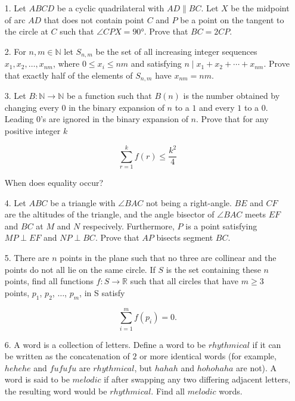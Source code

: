 \documentclass{article}
\begin{document}
\begin{enumerate}

\bigskip
\item[1.] %
Let $ABCD$ be a cyclic quadrilateral with $AD \parallel BC$. Let $X$ be the midpoint of arc $AD$ that does not contain point $C$ and $P$ be a point on the tangent to the circle at $C$ such that $\angle CPX = 90 \si{\degree} $. Prove that $BC = 2 CP$.   


\medskip
\item[2.] %
For $n,m\in\mathbb{N}$ let $S_{n,m}$ be the set of all increasing integer sequences $x_{1},x_{2},\ldots,x_{nm}$, where $0\leq x_i\leq nm$ and satisfying $n \mid x_{1} + x_{2} + \cdots +x_{nm}$. Prove that exactly half of the elements of $S_{n,m}$ have $x_{nm}=nm$.


\medskip
\item[3.] %
Let $B: \mathbb{N} \rightarrow \mathbb{N}$ be a function such that $B(n)$ is the number obtained by changing every $0$ in the binary expansion of $n$ to a $1$ and every $1$ to a $0$. Leading $0$'s are ignored in the binary expansion of $n$. Prove that for any positive integer $k$

$$\sum_{r=1}^{k} f(r) \le \frac{k^2}{4}$$

When does equality occur?


\medskip
\item[4.] %
Let $ABC$ be a triangle with $\angle BAC$ not being a right-angle. $BE$ and $CF$ are the altitudes of the triangle, and the angle bisector of $\angle BAC$ meets $EF$ and $BC$ at $M$ and $N$ respecively. Furthermore, $P$ is a point satisfying $MP \perp EF$ and $NP \perp BC$. Prove that $AP$ bisects segment $BC$.


\medskip
\item[5.] %
There are $n$ points in the plane such that no three are collinear and the points do not all lie on the same circle. If $S$ is the set containing these $n$ points, find all functions $f : S \rightarrow \mathbb{R}$ such that all circles that have $m \ge 3$ points, $p_1$, $p_2$, $\dots$, $p_m$, in S satisfy

$$\sum_{i = 1}^{m} f(p_i) = 0.$$



\medskip
\item[6.] %
A word is a collection of letters. Define a word to be $rhythmical$ if it can be written as the concatenation of $2$ or more identical words (for example, $hehehe$ and $fufufu$ are $rhythmical$, but $hahah$ and $hohohaha$ are not). A word is said to be $melodic$ if after swapping any two differing adjacent letters, the resulting word would be $rhythmical$. Find all $melodic$ words.



\end{enumerate}
\end{document}

